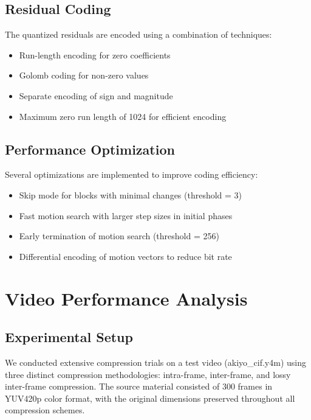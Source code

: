 \documentclass[a4paper,14pt]{article}
\begin{document}
\subsection{Residual Coding}
The quantized residuals are encoded using a combination of techniques:
\begin{itemize}
\item Run-length encoding for zero coefficients
\item Golomb coding for non-zero values
\item Separate encoding of sign and magnitude
\item Maximum zero run length of 1024 for efficient encoding
\end{itemize}
\subsection{Performance Optimization}
Several optimizations are implemented to improve coding efficiency:
\begin{itemize}
\item Skip mode for blocks with minimal changes (threshold = 3)
\item Fast motion search with larger step sizes in initial phases
\item Early termination of motion search (threshold = 256)
\item Differential encoding of motion vectors to reduce bit rate
\end{itemize}

\section{Video Performance Analysis}
\subsection{Experimental Setup}
We conducted extensive compression trials on a test video (akiyo\_cif.y4m) using three distinct compression methodologies: intra-frame, inter-frame, and lossy inter-frame compression. The source material consisted of 300 frames in YUV420p color format, with the original dimensions preserved throughout all compression schemes.
\end{document}
